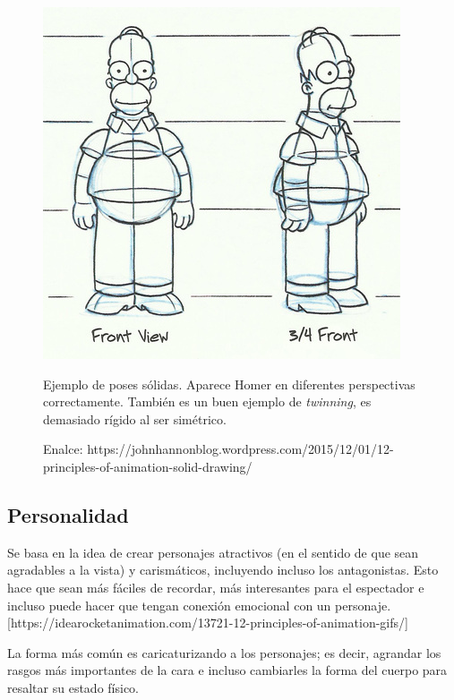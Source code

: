 \documentclass{article}
\begin{document}
\begin{figure}[H]
    \centering
    \includegraphics[width=\textwidth]{imagenes/homer-solid-drawing.jpg}
    \caption{Ejemplo de poses sólidas. Aparece Homer en diferentes perspectivas correctamente. También es un buen ejemplo de \textit{twinning}, es demasiado rígido al ser simétrico.}
    \caption{Enalce: https://johnhannonblog.wordpress.com/2015/12/01/12-principles-of-animation-solid-drawing/}
\end{figure}

\subsection{Personalidad}

Se basa en la idea de crear personajes atractivos (en el sentido de que sean agradables a la vista) y carismáticos, incluyendo incluso los antagonistas. Esto hace que sean más fáciles de recordar, más interesantes para el espectador e incluso puede hacer que tengan conexión emocional con un personaje. [https://idearocketanimation.com/13721-12-principles-of-animation-gifs/]

\bigskip

La forma más común es caricaturizando a los personajes; es decir, agrandar los rasgos más importantes de la cara e incluso cambiarles la forma del cuerpo para resaltar su estado físico.
\end{document}
